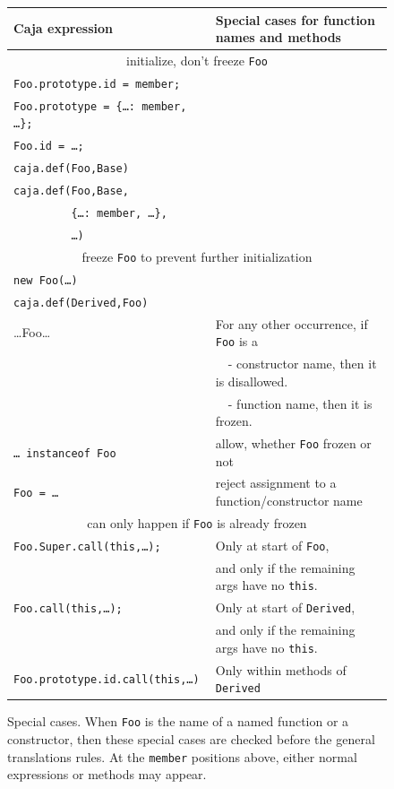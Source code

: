\documentclass[letterpaper,twocolumn,10pt]{article}
\newcommand{\code}[1]{{\tt {#1}}}              %
\begin{document}
\begin{figure}
\begin{tabular}{ll}
  Caja expression & Special cases for function names and methods \\ 
  \hline
           \multicolumn{2}{c}{initialize, don't freeze \code{Foo}} \\
  \code{Foo.prototype.id = member;} & \\
  \code{Foo.prototype = \{\ldots: member, {\ldots}\};} & \\
  \code{Foo.id = \ldots; } & \\
  \code{caja.def(Foo,Base)} & \\
  \code{caja.def(Foo,Base,} & \\
  \code{\ \ \ \ \ \ \ \ \ \{\ldots: member, {\ldots}\},} & \\
  \code{\ \ \ \ \ \ \ \ \ \ldots)} & \\
  \hline
   \multicolumn{2}{c}{freeze \code{Foo} to prevent further initialization} \\
  \code{new Foo(\ldots)} & \\ 
  \code{caja.def(Derived,Foo)} & \\
  {\ldots}Foo{\ldots} & For any other occurrence, if \code{Foo} is a \\
                      & \ \ - constructor name, then it is disallowed. \\
                      & \ \ - function name, then it is frozen. \\
  \hline
  \code{\ldots\ instanceof Foo} & allow, whether \code{Foo} frozen or not \\
  \code{Foo = \ldots} & reject assignment to a function/constructor name \\
  \hline
     \multicolumn{2}{c}{can only happen if \code{Foo} is already frozen} \\ 
          \code{Foo.Super.call(this,\ldots);} & Only at start of \code{Foo},\\
                       & and only if the remaining args have no \code{this}.\\
  \code{Foo.call(this,\ldots);}     & Only at start of \code{Derived}, \\
                       & and only if the remaining args have no \code{this}.\\
  \code{Foo.prototype.id.call(this,\ldots)} 
                                    & Only within methods of \code{Derived} \\   
\end{tabular}

\caption[Special cases]{Special cases. When \code{Foo} is the name of a named
function or a constructor, then these special cases are checked before the
general translations rules. At the \code{member} positions above, either
normal expressions or methods may appear.}
\label{tab:special-cases}
\end{figure}
\end{document}
